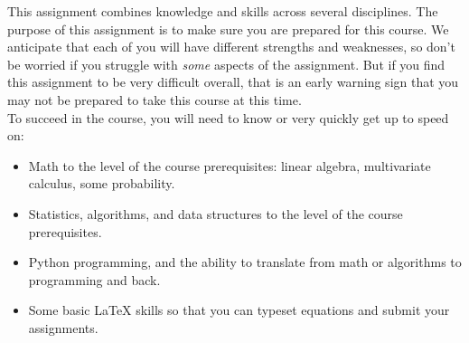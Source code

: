 

\usepackage{macros}
\usepackage{listings}
\usepackage{xcolor}



\lstset{style=mystyle}

\author{
\Large
Homework 1: Background Review + Building a classifier 
}




    \maketitle
    This assignment combines knowledge and skills across several disciplines. 
    The purpose of this assignment is to make sure you are prepared for this course. We anticipate that each
    of you will have different strengths and weaknesses, so don't be worried if you struggle with \emph{some} aspects
    of the assignment. But if you find this assignment to be very difficult overall, that is an early warning sign that you may not be prepared to take this course at this time. \\ 

    To succeed in the course, you will need to know or very quickly get up to speed on:
    \begin{itemize}
    \item Math to the level of the course prerequisites: linear algebra, multivariate calculus, some probability.
    \item Statistics, algorithms, and data structures to the level of the course prerequisites.
    \item Python programming, and the ability to translate from math or algorithms to programming and back.
    \item Some basic LaTeX skills so that you can typeset equations and submit your assignments.
    \end{itemize}

